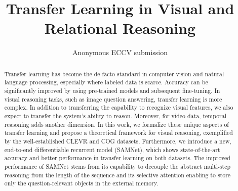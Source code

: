 \documentclass[runningheads]{llncs}
\begin{document}
\pagestyle{headings}
\mainmatter
\def\ECCVSubNumber{7169}

\title{Transfer Learning in Visual and Relational Reasoning}

\author{Anonymous ECCV submission}
\institute{Paper ID \ECCVSubNumber}

\begin{comment}
\author{T.S. Jayram\inst{1} \and  Vincent Marois\inst{2} \and Vincent Albouy\thanks{Work done while at IBM Research AI, Almaden Research Center} \and Tomasz Kornuta\inst{3} \and Ahmet Ozcan\inst{1}}

\authorrunning{T.S. Jayram et al.}

\institute{IBM Research AI, Almaden Research Center, San Jose, CA, USA\\ \email{\{jayram,  asozcan\}@us.ibm.com}
      \and IBM Research AI, Thomas J. Watson Research Center, York Town, NY, USA\\ \email{vincent.marois@ibm.com}
      \and NVIDIA, Santa Clara, CA, USA\\ \email{tkornuta@nvidia.com}}
\end{comment}
\maketitle

\begin{abstract}
Transfer learning has become the de facto standard in computer vision and natural language processing, especially where labeled data is scarce. Accuracy can be significantly improved by using pre-trained models and subsequent fine-tuning. In visual reasoning tasks, such as image question answering, transfer learning is more complex. In addition to transferring the capability to recognize visual features, we also expect to transfer the system’s ability to reason. Moreover, for video data, temporal reasoning adds another dimension. In this work, we formalize these unique aspects of transfer learning and propose a theoretical framework for visual reasoning, exemplified by the well-established CLEVR and COG datasets. Furthermore, we introduce a new, end-to-end differentiable recurrent model (SAMNet), which shows state-of-the-art accuracy and better performance in transfer learning on both datasets. The improved performance of SAMNet stems from its capability to decouple the abstract multi-step reasoning from the length of the sequence and its selective attention enabling to store only the question-relevant objects in the external memory.
\end{abstract}
\end{document}
